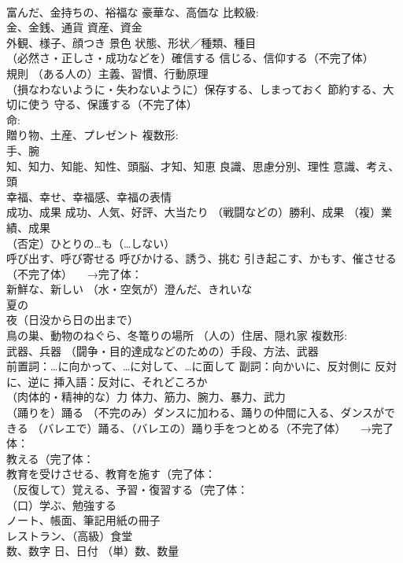 \documentclass[8pt]{extreport}
\begin{document}
\begin{CJK}{UTF8}{min}
\\	富んだ、金持ちの、裕福な 豪華な、高価な 比較級:
\\	金、金銭、通貨 資産、資金 
\\	外観、様子、顔つき 景色 状態、形状／種類、種目
\\	（必然さ・正しさ・成功などを）確信する 信じる、信仰する（不完了体）
\\	規則 （ある人の）主義、習慣、行動原理
\\	（損なわないように・失わないように）保存する、しまっておく 節約する、大切に使う 守る、保護する（不完了体） 
\\	命:
\\	贈り物、土産、プレゼント 複数形:
\\	手、腕
\\	知、知力、知能、知性、頭脳、才知、知恵 良識、思慮分別、理性 意識、考え、頭 
\\	幸福、幸せ、幸福感、幸福の表情
\\	成功、成果 成功、人気、好評、大当たり （戦闘などの）勝利、成果 （複）業績、成果
\\	（否定）ひとりの…も（…しない）
\\	呼び出す、呼び寄せる 呼びかける、誘う、挑む 引き起こす、かもす、催させる（不完了体） 　→完了体：
\\	新鮮な、新しい （水・空気が）澄んだ、きれいな
\\	夏の
\\	夜（日没から日の出まで）
\\	鳥の巣、動物のねぐら、冬篭りの場所 （人の）住居、隠れ家 複数形:
\\	武器、兵器 （闘争・目的達成などのための）手段、方法、武器
\\	前置詞：…に向かって、…に対して、…に面して 副詞：向かいに、反対側に 反対に、逆に 挿入語：反対に、それどころか
\\	（肉体的・精神的な）力 体力、筋力、腕力、暴力、武力
\\	（踊りを）踊る （不完のみ）ダンスに加わる、踊りの仲間に入る、ダンスができる （バレエで）踊る、（バレエの）踊り手をつとめる（不完了体） 　→完了体：
\\	教える（完了体：
\\	教育を受けさせる、教育を施す（完了体：
\\	（反復して）覚える、予習・復習する（完了体：
\\	（口）学ぶ、勉強する
\\	ノート、帳面、筆記用紙の冊子
\\	レストラン、（高級）食堂
\\	数、数字 日、日付 （単）数、数量

\end{CJK}
\end{document}
